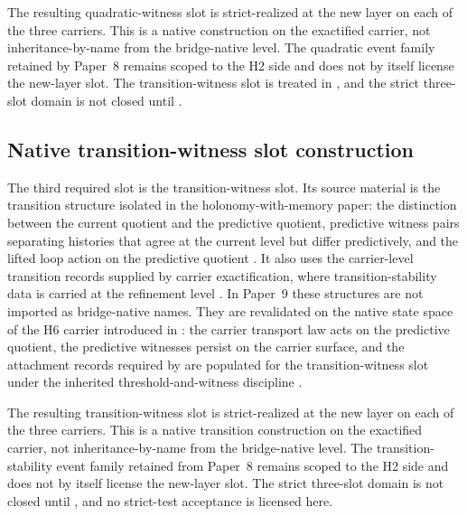\documentclass[11pt]{article}
\newcommand{\OldLayer}{H2}
\newcommand{\NewLayer}{H6}
\newcommand{\PaperNine}{Paper~9}
\newcommand{\PaperEight}{Paper~8}
\theoremstyle{definition}
\begin{document}
The resulting quadratic-witness slot is strict-realized at the new layer on
each of the three carriers.  This is a native construction on the exactified
carrier, not inheritance-by-name from the bridge-native level.  The quadratic
event family retained by \PaperEight{} remains scoped to the \OldLayer{} side
and does not by itself license the new-layer slot.  The transition-witness slot
is treated in , and
the strict three-slot domain is not closed until
.

\subsection{Native transition-witness slot construction}\label{subsec:native-transition-witness-slot-construction}

The third required slot is the transition-witness slot.  Its source material is
the transition structure isolated in the holonomy-with-memory paper: the
distinction between the current quotient and the predictive quotient, predictive
witness pairs separating histories that agree at the current level but differ
predictively, and the lifted loop action on the predictive quotient
\cite{Tsiokos2026HolonomyMemory}.  It also uses the carrier-level transition
records supplied by carrier exactification, where transition-stability data is
carried at the refinement level \cite{Tsiokos2026CarrierExactification}.  In
\PaperNine{} these structures are not imported as bridge-native names.  They
are revalidated on the native state space of the \NewLayer{} carrier introduced
in : the carrier transport law acts on the predictive
quotient, the predictive witnesses persist on the carrier surface, and the
attachment records required by 
are populated for the transition-witness slot under the inherited
threshold-and-witness discipline \cite{Tsiokos2026FoundationsII}.

The resulting transition-witness slot is strict-realized at the new layer on
each of the three carriers.  This is a native transition construction on the
exactified carrier, not inheritance-by-name from the bridge-native level.  The
transition-stability event family retained from \PaperEight{}
\cite{Tsiokos2026CarrierToEvent} remains scoped to the \OldLayer{} side and
does not by itself license the new-layer slot.  The strict three-slot domain is
not closed until , and no
strict-test acceptance is licensed here.
\end{document}
